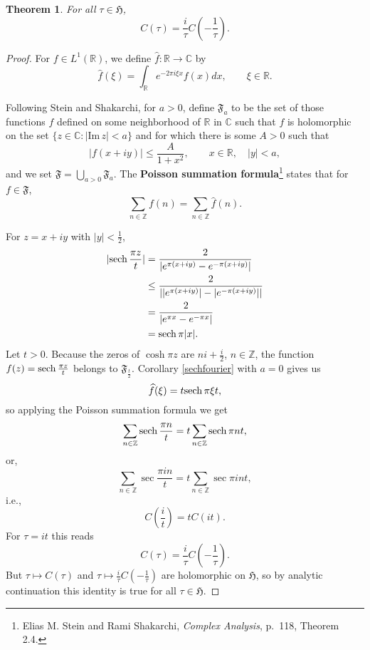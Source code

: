 \documentclass{article}
\def\Im{\ensuremath{\mathrm{Im}}\,}
\newcommand{\sech}{\ensuremath\mathrm{sech}\,}
\newtheorem{theorem}{Theorem}
\theoremstyle{definition}
\begin{document}
\begin{theorem}
For all $\tau \in \mathfrak{H}$,
\[
C(\tau) = \frac{i}{\tau} C\left( -\frac{1}{\tau} \right).
\]
\end{theorem}
\begin{proof}
For $f \in L^1(\mathbb{R})$, we define $\widehat{f}:\mathbb{R} \to \mathbb{C}$ by
\[
\widehat{f}(\xi) = \int_{\mathbb{R}} e^{-2\pi i \xi x} f(x) dx, \qquad \xi \in \mathbb{R}.
\]

Following Stein and Shakarchi, for $a>0$,  define $\mathfrak{F}_a$ to be the set of those functions
$f$ defined on some neighborhood of $\mathbb{R}$ in $\mathbb{C}$ such that $f$
is holomorphic on the set $\{z \in \mathbb{C}: |\Im z| < a\}$ and for which there is some $A>0$ such that
\[
|f(x+iy)| \leq \frac{A}{1+x^2}, \qquad x \in \mathbb{R}, \quad |y|<a,
\]
and we set $\mathfrak{F} = \bigcup_{a>0} \mathfrak{F}_a$. 
The \textbf{Poisson summation formula}\footnote{Elias M. Stein and Rami Shakarchi, {\em Complex Analysis},
p.~118, Theorem 2.4.} states that for $f \in \mathfrak{F}$,
\[
\sum_{n \in \mathbb{Z}} f(n) = \sum_{n \in \mathbb{Z}} \widehat{f}(n).
\]

For $z=x+iy$ with
$|y|<\frac{1}{2}$, 
\begin{align*}
|\sech \frac{\pi z}{t}|&=\frac{2}{|e^{\pi (x+iy)}-e^{-\pi(x+iy)}|}\\
&\leq \frac{2}{||e^{\pi(x+iy)}|-|e^{-\pi(x+iy)}||}\\
&=\frac{2}{|e^{\pi x}-e^{-\pi x}|}\\
&=\sech \pi |x|.
\end{align*}
Let $t>0$. 
Because the zeros of $\cosh \pi z$ are $ni+\frac{i}{2}$, $n \in \mathbb{Z}$,
the function $f(z)=\sech \frac{\pi z}{t}$ belongs to $\mathfrak{F}_{\frac{t}{2}}$. 
 Corollary \ref{sechfourier} with $a=0$ gives us
\[
\widehat{f}(\xi) 
=t \sech \pi \xi t,
\]
so applying the Poisson summation formula we get
\[
\sum_{n \in \mathbb{Z}} \sech \frac{\pi n}{t}
=
t\sum_{n \in \mathbb{Z}} \sech \pi nt,
\]
or,
\[
\sum_{n \in \mathbb{Z}} \sec \frac{\pi i n}{t} = t \sum_{n \in \mathbb{Z}}
\sec \pi int,
\]
i.e.,
\[
C\left( \frac{i}{t} \right) = t C(it).
\]
For $\tau=it$ this reads
\[
C(\tau) = \frac{i}{\tau} C\left( -\frac{1}{\tau} \right).
\]
But $\tau \mapsto C(\tau)$ and $\tau \mapsto \frac{i}{\tau} C\left( -\frac{1}{\tau} \right)$ are holomorphic
on $\mathfrak{H}$, so by analytic continuation this identity is true for all $\tau \in \mathfrak{H}$.
\end{proof}
\end{document}
